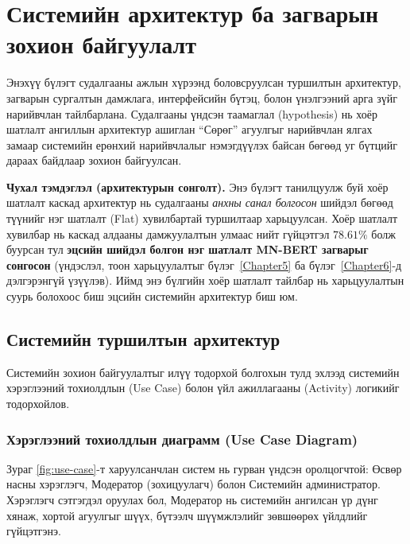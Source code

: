 ﻿%

\chapter{Системийн архитектур ба загварын зохион байгуулалт}
\label{Chapter3}

Энэхүү бүлэгт судалгааны ажлын хүрээнд боловсруулсан туршилтын архитектур, загварын
сургалтын дамжлага, интерфейсийн бүтэц, болон үнэлгээний арга зүйг нарийвчлан
тайлбарлана. Судалгааны үндсэн таамаглал (hypothesis) нь хоёр шатлалт ангиллын
архитектур ашиглан ``Сөрөг'' агуулгыг нарийвчлан ялгах замаар системийн
ерөнхий нарийвчлалыг нэмэгдүүлэх байсан бөгөөд уг бүтцийг дараах байдлаар
зохион байгуулсан.

\textbf{Чухал тэмдэглэл (архитектурын сонголт).} Энэ бүлэгт танилцуулж буй
хоёр шатлалт каскад архитектур нь судалгааны \emph{анхны санал болгосон}
шийдэл бөгөөд түүнийг нэг шатлалт (Flat) хувилбартай туршилтаар харьцуулсан.
Хоёр шатлалт хувилбар нь каскад алдааны дамжуулалтын улмаас нийт гүйцэтгэл
$78.61\%$ болж буурсан тул \textbf{эцсийн шийдэл болгон нэг шатлалт MN-BERT
загварыг сонгосон} (үндэслэл, тоон харьцуулалтыг бүлэг~\ref{Chapter5} ба
бүлэг~\ref{Chapter6}-д дэлгэрэнгүй үзүүлэв). Иймд энэ бүлгийн хоёр шатлалт
тайлбар нь харьцуулалтын суурь болохоос биш эцсийн системийн архитектур биш юм.

\section{Системийн туршилтын архитектур}

Системийн зохион байгуулалтыг илүү тодорхой болгохын тулд эхлээд системийн
хэрэглээний тохиолдлын (Use Case) болон үйл ажиллагааны (Activity) логикийг
тодорхойлов.

\subsection{Хэрэглээний тохиолдлын диаграмм (Use Case Diagram)}

Зураг \ref{fig:use-case}-т харуулсанчлан систем нь гурван үндсэн оролцогчтой:
Өсвөр насны хэрэглэгч, Модератор (зохицуулагч) болон Системийн администратор.
Хэрэглэгч сэтгэгдэл оруулах бол, Модератор нь системийн ангилсан үр дүнг хянаж,
хортой агуулгыг шүүх, бүтээлч шүүмжлэлийг зөвшөөрөх үйлдлийг гүйцэтгэнэ.

